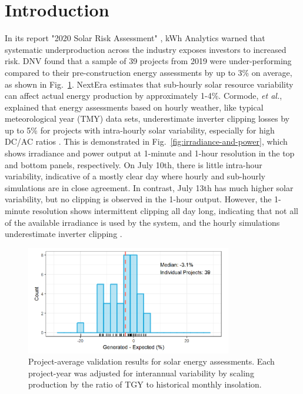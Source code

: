 \documentclass[conference]{IEEEtran}
\begin{document}
\section{Introduction}
In its report "2020 Solar Risk Assessment" \cite{Matsui2020}, kWh Analytics warned that systematic underproduction across the industry exposes investors to increased risk. DNV found that a sample of 39 projects from 2019 were under-performing compared to their pre-construction energy assessments by up to 3\% on average, as shown in Fig.~\ref{fig:project-underperformance}. NextEra estimates that sub-hourly solar resource variability can affect actual energy production by approximately 1-4\%. Cormode, \textit{et al.}, explained that energy assessments based on hourly weather, like typical meteorological year (TMY) data sets, underestimate inverter clipping losses by up to 5\% for projects with intra-hourly solar variability, especially for high DC/AC ratios \cite{Cormode2019}. This is demonstrated in Fig.~\ref{fig:irradiance-and-power}, which shows irradiance and power output at 1-minute and 1-hour resolution in the top and bottom panels, respectively. On July 10th, there is little intra-hour variability, indicative of a mostly clear day where hourly and sub-hourly simulations are in close agreement. In contrast, July 13th has much higher solar variability, but no clipping is observed in the 1-hour output. However, the 1-minute resolution shows intermittent clipping all day long, indicating that not all of the available irradiance is used by the system, and the hourly simulations underestimate inverter clipping \cite{Kharait}.


\begin{figure}[htbp]
\centerline{\includegraphics[width=9cm]{fig1.png}}
\caption{Project-average validation results for solar energy assessments. Each project-year was adjusted for interannual variability by scaling production by the ratio of TGY to historical monthly insolation.}
\label{fig:project-underperformance}
\end{figure}
\end{document}
